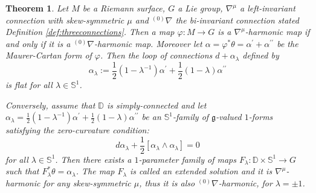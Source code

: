 \documentclass[12pt]{amsart}
\newtheorem{Theorem}{Theorem}[section]
\theoremstyle{definition}
\theoremstyle{remark}
\numberwithin{equation}{section}
\begin{document}
\begin{Theorem}\label{thm:familyofconnections}
 Let $M$ be a Riemann surface, $G$ a Lie group, ${\nabla^{\mu}}$ 
 a left-invariant connection with skew-symmetric $\mu$ and 
 ${{}^{(0)}\nabla}$ the bi-invariant connection stated Definition \ref{def:threeconnections}.
 Then a map $\varphi : M \to G$ is a ${\nabla^{\mu}}$-harmonic map if and only if 
 it is a ${{}^{(0)}\nabla}$-harmonic map. Moreover 
 let $\alpha = \varphi^{*}\theta = \alpha^{\prime} + 
 \alpha^{\prime \prime}$ be the Maurer-Cartan form of $\varphi$.
 Then the loop of connections $d+\alpha_{\lambda}$ defined by
\begin{equation}\label{alpha-family-skew}
 \alpha_{\lambda}:=
\frac{1}{2}(1-\lambda^{-1})\alpha^{\prime} 
 +\frac{1}{2}(1-\lambda)\alpha^{\prime\prime}
\end{equation}
 is flat for all $\lambda \in \mathbb S^1$. 

 Conversely, assume that $\mathbb{D}$ is simply-connected
 and let $\alpha_{\lambda}=
 \frac{1}{2}(1-\lambda^{-1})\alpha^{\prime}+
 \frac{1}{2}(1-\lambda)\alpha^{\prime \prime}$ 
 be an $\mathbb{S}^1$-family of 
 $\mathfrak{g}$-valued $1$-forms satisfying 
 the zero-curvature condition{\rm:}
\begin{equation*}
 d\alpha_{\lambda}+\frac{1}{2}[\alpha_\lambda\wedge \alpha_\lambda]=0
\end{equation*}
 for all $\lambda \in \mathbb{S}^1$.
 Then there exists a $1$-parameter family of maps $F_\lambda:
 \mathbb{D}\times \mathbb{S}^1\to G$ such that 
 $F_{\lambda}^{*}\theta= \alpha_{\lambda}$. 
 The map $F_{\lambda}$ is called an \textrm{extended solution} and it is
 ${\nabla^{\mu}}$-harmonic for  any skew-symmetric $\mu$,
 thus it is also ${{}^{(0)}\nabla}$-harmonic, for $\lambda=\pm 1$.
\end{Theorem}
\end{document}
